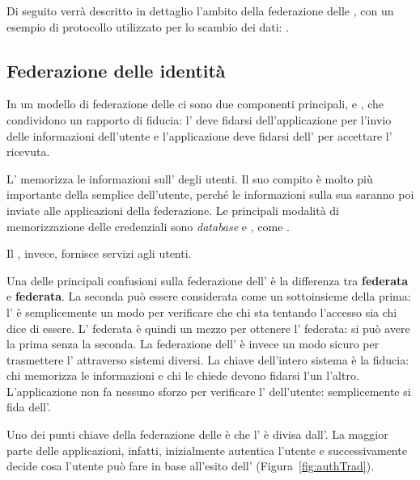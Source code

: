 Di seguito verrà descritto in dettaglio l'ambito della federazione delle , con un esempio di protocollo utilizzato per lo scambio dei dati: .

\subsection{Federazione delle identità}
In un modello di federazione delle  ci sono due componenti principali,  e , che condividono un rapporto di fiducia: l' deve fidarsi dell'applicazione per l'invio delle informazioni dell'utente e l'applicazione deve fidarsi dell' per accettare l' ricevuta.

L' memorizza le informazioni sull' degli utenti. Il suo compito è molto più importante della semplice  dell'utente, perché le informazioni sulla sua  saranno poi inviate alle applicazioni della federazione. Le principali modalità di memorizzazione delle credenziali sono \textit{database} e , come .

Il , invece, fornisce servizi agli utenti.

Una delle principali confusioni sulla federazione dell' è la differenza tra \textbf{ federata} e \textbf{ federata}. La seconda può essere considerata come un sottoinsieme della prima: l' è semplicemente un modo per verificare che chi sta tentando l'accesso sia chi dice di essere. L' federata è quindi un mezzo per ottenere l' federata: si può avere la prima senza la seconda. La federazione dell' è invece un modo sicuro per trasmettere l' attraverso sistemi diversi. La chiave dell'intero sistema è la fiducia: chi memorizza le informazioni e chi le chiede devono fidarsi l'un l'altro. L'applicazione non fa nessuno sforzo per verificare l' dell'utente: semplicemente si fida dell'. 

Uno dei punti chiave della federazione delle  è che l' è divisa dall'. La maggior parte delle applicazioni, infatti, inizialmente autentica l'utente e successivamente decide cosa l'utente può fare in base all'esito dell' (Figura~\ref{fig:authTrad}).

